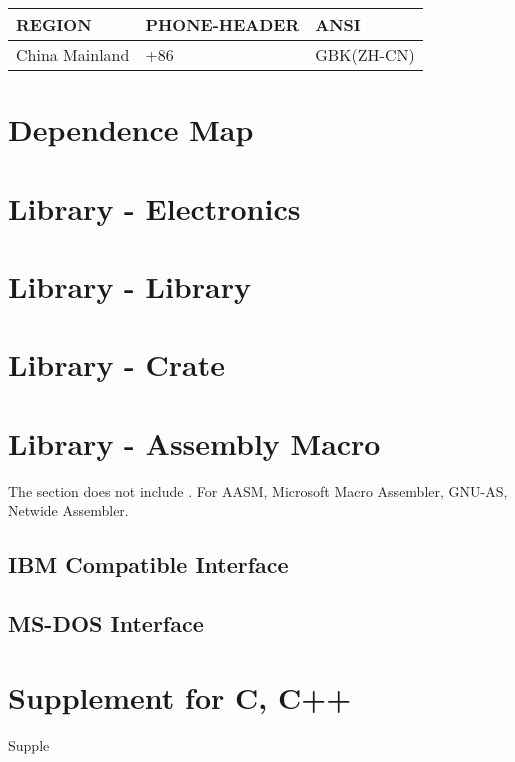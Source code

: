 \begin{center}\begin{table}[h!]
	\begin{tabular}{|l|l|l|}
	\hline
	\rowcolor[rgb]{0.95, 0.975, 1}\textbf{REGION} & \textbf{PHONE-HEADER} & \textbf{ANSI} \\ \hline
	China Mainland & +86 & GBK(ZH-CN) \\ \hline
	\end{tabular}
\end{table}\end{center}

\section{Dependence Map}

\section{Library \mbox{-} Electronics}

\section{Library \mbox{-}  Library}

\section{Library \mbox{-}  Crate}

\section{Library \mbox{-} Assembly Macro}

The section does not include . For AASM, Microsoft Macro Assembler, GNU-AS, Netwide Assembler.


\subsection{IBM Compatible Interface}

\subsection{MS-DOS Interface}

\section{Supplement for C, C++}
{Supple}

